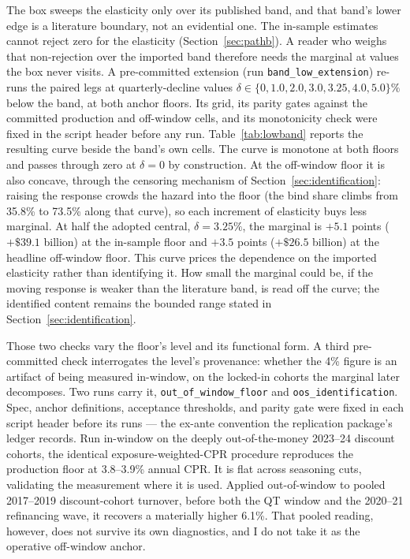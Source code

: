 \documentclass[12pt]{article}
\begin{document}
The box sweeps the elasticity only over its published band, and that band's lower edge is a literature boundary, not an evidential one. The in-sample estimates cannot reject zero for the elasticity (Section~\ref{sec:pathb}). A reader who weighs that non-rejection over the imported band therefore needs the marginal at values the box never visits. A pre-committed extension (run \texttt{band\_low\_extension}) re-runs the paired legs at quarterly-decline values $\delta \in \{0, 1.0, 2.0, 3.0, 3.25, 4.0, 5.0\}\%$ below the band, at both anchor floors. Its grid, its parity gates against the committed production and off-window cells, and its monotonicity check were fixed in the script header before any run. Table~\ref{tab:lowband} reports the resulting curve beside the band's own cells. The curve is monotone at both floors and passes through zero at $\delta = 0$ by construction. At the off-window floor it is also concave, through the censoring mechanism of Section~\ref{sec:identification}: raising the response crowds the hazard into the floor (the bind share climbs from 35.8\% to 73.5\% along that curve), so each increment of elasticity buys less marginal. At half the adopted central, $\delta = 3.25\%$, the marginal is $+5.1$ points ($+\$39.1$ billion) at the in-sample floor and $+3.5$ points ($+\$26.5$ billion) at the headline off-window floor. This curve prices the dependence on the imported elasticity rather than identifying it. How small the marginal could be, if the moving response is weaker than the literature band, is read off the curve; the identified content remains the bounded range stated in Section~\ref{sec:identification}.


Those two checks vary the floor's level and its functional form. A third pre-committed check interrogates the level's provenance: whether the 4\% figure is an artifact of being measured in-window, on the locked-in cohorts the marginal later decomposes. Two runs carry it, \texttt{out\_of\_window\_floor} and \texttt{oos\_identification}. Spec, anchor definitions, acceptance thresholds, and parity gate were fixed in each script header before its runs --- the ex-ante convention the replication package's ledger records. Run in-window on the deeply out-of-the-money 2023--24 discount cohorts, the identical exposure-weighted-CPR procedure reproduces the production floor at 3.8--3.9\% annual CPR. It is flat across seasoning cuts, validating the measurement where it is used. Applied out-of-window to pooled 2017--2019 discount-cohort turnover, before both the QT window and the 2020--21 refinancing wave, it recovers a materially higher 6.1\%. That pooled reading, however, does not survive its own diagnostics, and I do not take it as the operative off-window anchor.
\end{document}
